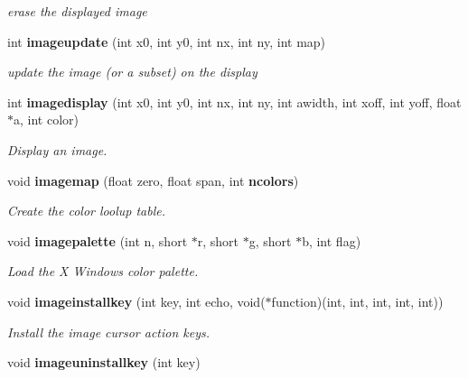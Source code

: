 \begin{CompactItemize}
\begin{CompactList}\small\item\em erase the displayed image \item\end{CompactList}\item 
int {\bf imageupdate} (int x0, int y0, int nx, int ny, int map)
\begin{CompactList}\small\item\em update the image (or a subset) on the display \item\end{CompactList}\item 
int {\bf imagedisplay} (int x0, int y0, int nx, int ny, int awidth, int xoff, int yoff, float $\ast$a, int color)
\begin{CompactList}\small\item\em Display an image. \item\end{CompactList}\item 
void {\bf imagemap} (float zero, float span, int {\bf ncolors})
\begin{CompactList}\small\item\em Create the color loolup table. \item\end{CompactList}\item 
void {\bf imagepalette} (int n, short $\ast$r, short $\ast$g, short $\ast$b, int flag)
\begin{CompactList}\small\item\em Load the X Windows color palette. \item\end{CompactList}\item 
void {\bf imageinstallkey} (int key, int echo, void($\ast$function)(int, int, int, int, int))
\begin{CompactList}\small\item\em Install the image cursor action keys. \item\end{CompactList}\item 
void {\bf imageuninstallkey} (int key)\label{xtvutils_8c_a174}


\end{CompactItemize}
